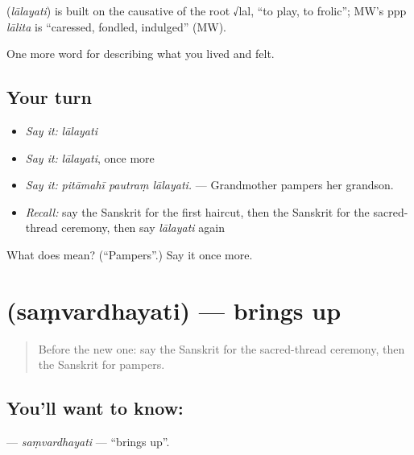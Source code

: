 \begin{cousinweb}
\textbf{} (\emph{lālayati}) is built on the causative of the root √lal, \textquotedblleft{}to play, to frolic\textquotedblright{}; MW's ppp \emph{lālita} is \textquotedblleft{}caressed, fondled, indulged\textquotedblright{} (MW).
\end{cousinweb}

\begin{grammarlens}[title={What you've built}]
One more word for describing what you lived and felt.
\end{grammarlens}

\subsection*{Your turn}
\begin{itemize}
\raggedright
  \item \emph{Say it:} \emph{lālayati}
  \item \emph{Say it:} \emph{lālayati}, once more
  \item \emph{Say it:} \emph{pitāmahī pautraṃ lālayati.} — Grandmother pampers her grandson.
  \item \emph{Recall:} say the Sanskrit for the first haircut, then the Sanskrit for the sacred-thread ceremony, then say \emph{lālayati} again
\end{itemize}

\begin{tcolorbox}[breakable,colback=teal!4,colframe=teal!35!black,title={Before you move on}]
What does  mean? (\textquotedblleft{}Pampers\textquotedblright{}.) Say it once more.
\end{tcolorbox}
\section[\texorpdfstring{\sk{संवर्धयति} (saṃvardhayati)}{संवर्धयति (saṃvardhayati)}]{ (saṃvardhayati) — brings up}

\label{lesson:SA-C494-samvardhayati}



\begin{quote}
Before the new one: say the Sanskrit for the sacred-thread ceremony, then the Sanskrit for pampers.
\end{quote}

\subsection*{You'll want to know: }
\textbf{} — \emph{saṃvardhayati} — \textquotedblleft{}brings up\textquotedblright{}.

